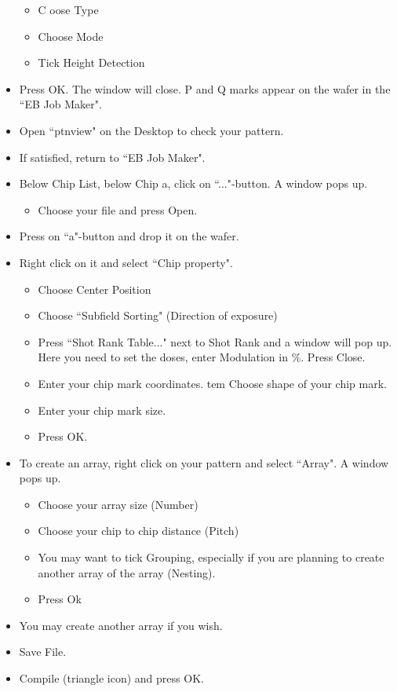 \begin{itemize}
\begin{itemize}
  \item C oose Type
  \item Choose Mode
  \item Tick Height Detection
  \end{itemize}
\item Press OK.   The window will close.  P  and Q marks appear on  the wafer in
  the ``EB Job Maker".
\item Open ``ptnview" on the Desktop to check your pattern.
\item If satisfied, return to ``EB Job Maker".
\item Below Chip List, below Chip a, click on ``..."-button.  A window pops up.
  \begin{itemize}
  \item Choose your file and press Open.
  \end{itemize}
\item Press on ``a"-button and drop it on the wafer.
\item Right click on it and select ``Chip property".
  \begin{itemize}
  \item Choose Center Position
  \item Choose ``Subfield Sorting" (Direction of exposure)
  \item Press  ``Shot Rank Table..."   next to Shot Rank  and a window  will pop
    up. Here you need to set the doses, enter Modulation in \%. Press Close.
  \item Enter your chip mark coordinates.  tem Choose shape of your chip mark.
  \item Enter your chip mark size.
  \item Press OK.
  \end{itemize}
\item To  create an array,  right click on your  pattern and select  ``Array". A
  window pops up.
  \begin{itemize}
  \item Choose your array size (Number)
  \item Choose your chip to chip distance (Pitch)
  \item You may want to tick Grouping,  especially if you are planning to create
    another array of the array (Nesting).
  \item Press Ok
  \end{itemize}
\item You may create another array if you wish.
\item Save File.
\item Compile (triangle icon) and press OK.
\end{itemize}
